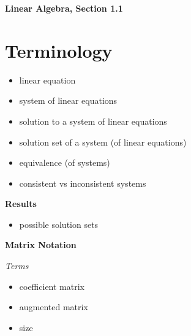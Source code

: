 \documentclass[12pt]{article}
\begin{document}
\begin{center}
\textbf{Linear Algebra, Section 1.1}%
\end{center}
\bigskip


\section{Terminology}
\begin{itemize}
    \item linear equation
    \vspace{3cm}
    \item system of linear equations
    \vspace{3cm}
    \item solution to a system of linear equations
    \item solution set of a system (of linear equations)
    \item equivalence (of systems)
    \item consistent vs inconsistent systems
\end{itemize}

{\bf Results}
\begin{itemize}
    \item possible solution sets
\end{itemize}

{\bf Matrix Notation} 

\bigskip
{\it Terms}
\begin{itemize}
    \item coefficient matrix
    \item augmented matrix
    \item size
\end{itemize}



\vspace{.2cm}
\end{document}
